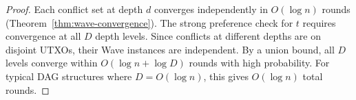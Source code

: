 \begin{proof}
Each conflict set at depth $d$ converges independently in $O(\log n)$ rounds
(Theorem~\ref{thm:wave-convergence}). The strong preference check for $t$ requires convergence
at all $D$ depth levels. Since conflicts at different depths are on disjoint UTXOs, their
Wave instances are independent. By a union bound, all $D$ levels converge within
$O(\log n + \log D)$ rounds with high probability. For typical DAG structures where
$D = O(\log n)$, this gives $O(\log n)$ total rounds.
\end{proof}

